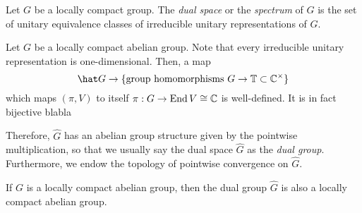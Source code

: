 \documentclass[10pt]{article}
\begin{document}
\begin{defn}
Let $G$ be a locally compact group.
The \emph{dual space} or the \emph{spectrum} of $G$ is the set of unitary equivalence classes of irreducible unitary representations of $G$. 
\end{defn}
\begin{defn}
Let $G$ be a locally compact abelian group.
Note that every irreducible unitary representation is one-dimensional.
Then, a map
\[\hat G\to\{\text{group homomorphisms }G\to\T\subset\C^\times\}\]
which maps $(\pi,V)$ to itself $\pi:G\to\operatorname{End}{V}\cong\mathbb{C}$ is well-defined.
It is in fact bijective blabla

Therefore, $\hat G$ has an abelian group structure given by the pointwise multiplication, so that we usually say the dual space $\hat G$ as the \emph{dual group}.
Furthermore, we endow the topology of pointwise convergence on $\hat G$.
\end{defn}
\begin{prop}
If $G$ is a locally compact abelian group, then the dual group $\hat G$ is also a locally compact abelian group.
\end{prop}

\begin{ex}
\end{ex}




\end{document}
